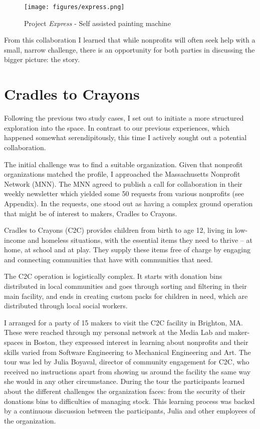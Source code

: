    \begin{figure}[thpb]
      \centering
      \texttt{[image: figures/express.png]}
      \caption{Project \textit{Express} - Self assisted painting machine}
      \label{express}
   \end{figure}

From this collaboration I learned that while nonprofits will often seek help with a small, narrow challenge, there is an opportunity for both parties in discussing the bigger picture: the story. 

\section{Cradles to Crayons}

Following the previous two study cases, I set out to initiate a more structured exploration into the space. In contrast to our previous experiences, which happened somewhat serendipitously, this time I actively sought out a potential collaboration. 

The initial challenge was to find a suitable organization. Given that nonprofit organizations matched the profile, I approached the Massachusetts Nonprofit Network (MNN). The MNN agreed to publish a call for collaboration in their weekly newsletter which yielded some 50 requests from various nonprofits (see Appendix). In the requests, one stood out as having a complex ground operation that might be of interest to makers, Cradles to Crayons.   

Cradles to Crayons (C2C) provides children from birth to age 12, living in low-income and homeless situations, with the essential items they need to thrive – at home, at school and at play. They supply these items free of charge by engaging and connecting communities that have with communities that need.

The C2C operation is logistically complex. It starts with donation bins distributed in local communities and goes through sorting and filtering in their main facility, and ends in creating custom packs for children in need, which are distributed through local social workers. 

I arranged for a party of 15 makers to visit the C2C facility in Brighton, MA. These were reached through my personal network at the Media Lab and maker-spaces in Boston, they expressed interest in learning about nonprofits and their skills varied from Software Engineering to Mechanical Engineering and Art. The tour was led by Julia Boyaval, director of community engagement for C2C, who received no instructions apart from showing us around the facility the same way she would in any other circumstance. During the tour the participants learned about the different challenges the organization faces: from the security of their donations bins to difficulties of managing stock. This learning process was backed by a continuous discussion between the participants, Julia and other employees of the organization. 


